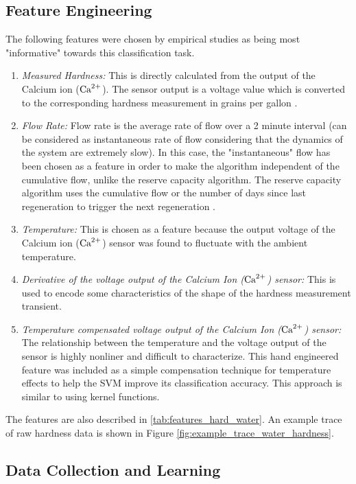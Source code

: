 \subsection{Feature Engineering}

The following features were chosen by empirical studies as being most "informative" towards this classification task.

\begin{enumerate}
\item \emph{Measured Hardness:} This is directly calculated from the output of the Calcium ion ($\text{Ca}^{2+}$).
 The sensor output is a voltage value which is converted to the corresponding hardness measurement in grains per gallon \cite{WhatIsWaterHardness}.
\item \emph{Flow Rate:} Flow rate is the average rate of flow over a 2 minute interval (can be considered as instantaneous rate of flow considering that the dynamics of the system are extremely slow).
 In this case, the "instantaneous" flow has been chosen as a feature in order to make the algorithm independent of the cumulative flow, unlike the reserve capacity algorithm.
 The reserve capacity algorithm uses the cumulative flow or the number of days since last regeneration to trigger the next regeneration \cite{NSFSoftener}.
\item \emph{Temperature:} This is chosen as a feature because the output voltage of the Calcium ion ($\text{Ca}^{2+}$) sensor was found to fluctuate with the ambient temperature.
\item \emph{Derivative of the voltage output of the Calcium Ion ($\text{Ca}^{2+}$) sensor:} This is used to encode some characteristics of the shape of the hardness measurement transient.
\item \emph{Temperature compensated voltage output of the Calcium Ion ($\text{Ca}^{2+}$) sensor:} The relationship between the temperature and the voltage output of the sensor is highly nonliner and difficult to characterize.
 This hand engineered feature was included as a simple compensation technique for temperature effects to help the SVM improve its classification accuracy.
 This approach is similar to using kernel functions.

\end{enumerate}

The features are also described in \ref{tab:features_hard_water}. An example trace of raw hardness data is shown in Figure \ref{fig:example_trace_water_hardness}.

\subsection{Data Collection and Learning}
\label{sec:water_hardness_learning}

